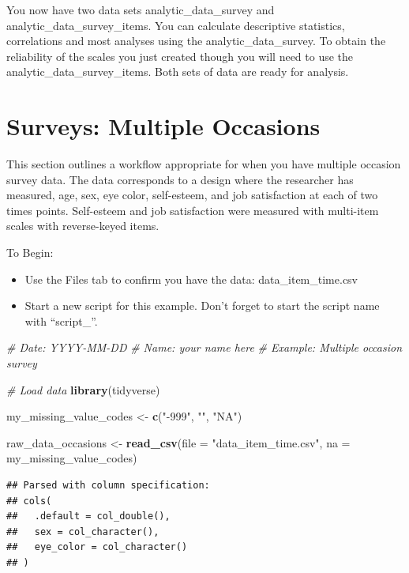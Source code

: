 \documentclass[
]{krantz}
\makeatletter
\newenvironment{Shaded}{\begin{snugshade}}{\end{snugshade}}
\newcommand{\CommentTok}[1]{\textcolor[rgb]{0.37,0.37,0.37}{\textit{#1}}}
\newcommand{\DataTypeTok}[1]{\textcolor[rgb]{0.27,0.27,0.27}{#1}}
\newcommand{\KeywordTok}[1]{\textcolor[rgb]{0.27,0.27,0.27}{\textbf{#1}}}
\newcommand{\NormalTok}[1]{#1}
\newcommand{\StringTok}[1]{\textcolor[rgb]{0.5,0.5,0.5}{#1}}
\newenvironment{kframe}{%
\medskip{}
\setlength{\fboxsep}{.8em}
 \def\at@end@of@kframe{}%
 \ifinner\ifhmode%
  \def\at@end@of@kframe{\end{minipage}}%
  \begin{minipage}{\columnwidth}%
 \fi\fi%
 \def\FrameCommand##1{\hskip\@totalleftmargin \hskip-\fboxsep
 \colorbox{shadecolor}{##1}\hskip-\fboxsep
     \hskip-\linewidth \hskip-\@totalleftmargin \hskip\columnwidth}%
 \MakeFramed {\advance\hsize-\width
   \@totalleftmargin\z@ \linewidth\hsize
   \@setminipage}}%
 {\par\unskip\endMakeFramed%
 \at@end@of@kframe}
\renewenvironment{Shaded}{\begin{kframe}}{\end{kframe}}
\makeatother
\begin{document}
You now have two data sets analytic\_data\_survey and analytic\_data\_survey\_items. You can calculate descriptive statistics, correlations and most analyses using the analytic\_data\_survey. To obtain the reliability of the scales you just created though you will need to use the analytic\_data\_survey\_items. Both sets of data are ready for analysis.

\hypertarget{surveys-multiple-occasions}{%
\section{Surveys: Multiple Occasions}\label{surveys-multiple-occasions}}

This section outlines a workflow appropriate for when you have multiple occasion survey data. The data corresponds to a design where the researcher has measured, age, sex, eye color, self-esteem, and job satisfaction at each of two times points. Self-esteem and job satisfaction were measured with multi-item scales with reverse-keyed items.

To Begin:

\begin{itemize}
\item
  Use the Files tab to confirm you have the data: data\_item\_time.csv
\item
  Start a new script for this example. Don't forget to start the script name with ``script\_''.
\end{itemize}

\begin{Shaded}
\begin{Highlighting}[]
\CommentTok{# Date: YYYY-MM-DD}
\CommentTok{# Name: your name here}
\CommentTok{# Example: Multiple occasion survey}

\CommentTok{# Load data}
\KeywordTok{library}\NormalTok{(tidyverse)}

\NormalTok{my_missing_value_codes <-}\StringTok{ }\KeywordTok{c}\NormalTok{(}\StringTok{"-999"}\NormalTok{, }\StringTok{""}\NormalTok{, }\StringTok{"NA"}\NormalTok{)}

\NormalTok{raw_data_occasions <-}\StringTok{ }\KeywordTok{read_csv}\NormalTok{(}\DataTypeTok{file =} \StringTok{"data_item_time.csv"}\NormalTok{,}
                               \DataTypeTok{na =}\NormalTok{ my_missing_value_codes)}
\end{Highlighting}
\end{Shaded}

\begin{verbatim}
## Parsed with column specification:
## cols(
##   .default = col_double(),
##   sex = col_character(),
##   eye_color = col_character()
## )
\end{verbatim}
\end{document}
